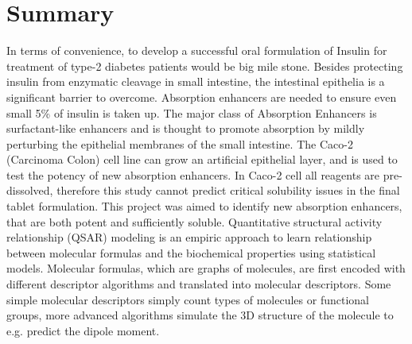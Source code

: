 \chapter{Summary}
In terms of convenience, to develop a successful oral formulation of Insulin for treatment of type-2 diabetes patients would be big mile stone. Besides protecting insulin from enzymatic cleavage in small intestine, the intestinal epithelia is a significant barrier to overcome. Absorption enhancers are needed to ensure even small 5\% of insulin is taken up. The major class of Absorption Enhancers is surfactant-like enhancers and is thought to promote absorption by mildly perturbing the epithelial membranes of the small intestine. The Caco-2 (Carcinoma Colon) cell line can grow an artificial epithelial layer, and is used to test the potency of new absorption enhancers. In Caco-2 cell all reagents are pre-dissolved, therefore this study cannot predict critical solubility issues in the final tablet formulation. This project was aimed to identify new absorption enhancers, that are both potent and sufficiently soluble. Quantitative structural activity relationship (QSAR) modeling is an empiric approach to learn relationship between molecular formulas and the biochemical properties using statistical models. Molecular formulas, which are graphs of molecules, are first encoded with different descriptor algorithms and translated into molecular descriptors. Some simple molecular descriptors simply count types of molecules or functional groups, more advanced algorithms simulate the 3D structure of the molecule to e.g. predict the dipole moment.
